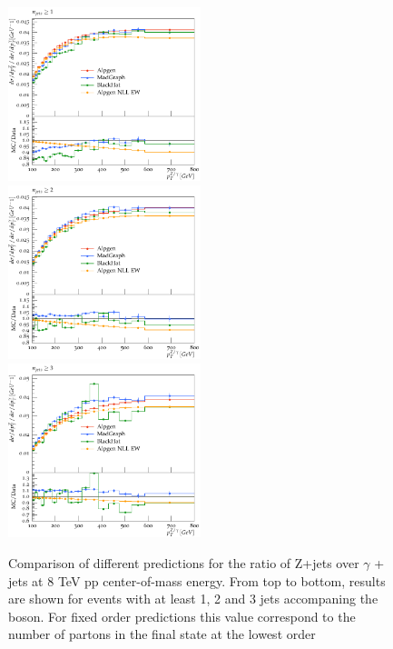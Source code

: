 \documentclass[11pt]{cernrep} \usepackage{graphicx,epsfig} 
\begin{document}
\begin{figure}
\begin{center}
\includegraphics[width=0.5\textwidth]{d07-x01-y01-mc.pdf} \\
\includegraphics[width=0.5\textwidth]{d08-x01-y01-mc.pdf} \\
\includegraphics[width=0.5\textwidth]{d08-x02-y01-mc.pdf}
 \caption{Comparison of different predictions for the ratio of Z+jets over $\gamma$ + jets at 8 TeV pp
   center-of-mass energy. From top to bottom, results are shown for events with at least 1, 2 and 3 jets accompaning the
   boson. For fixed order predictions this value
correspond to the number of partons in the final state at the lowest
order}
\label{zgrmc}
\end{center}
\end{figure}
\end{document}
